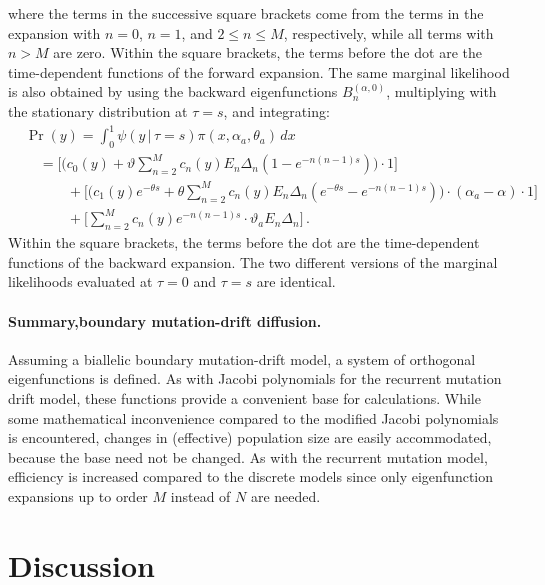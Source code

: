 \documentclass[preprint]{elsarticle}
\newcommand\given{{\,|\,}}
\newcommand\y{\ensuremath{y}}
\begin{document}
where the terms in the successive square brackets come from the terms in the expansion with $n=0$, $n=1$, and $2\leq n\leq M$, respectively, while all terms with $n>M$ are zero. Within the square brackets, the terms before the dot are the time-dependent functions of the forward expansion. The same marginal likelihood is also obtained by using the backward eigenfunctions $B_n^{(\alpha,0)}$, multiplying with the stationary distribution at $\tau=s$, and integrating:
\begin{equation}
\begin{split}
    &\Pr(\y)=\int_0^1 \psi(\y\given \tau=s)\pi(x,\alpha_a,\theta_a)\,dx\\
    &\quad=\bigg[\bigg(c_0(\y)+\vartheta\sum_{n=2}^M c_n(\y)E_n\Delta_n  (1-e^{-n(n-1)s})\bigg)\cdot 1\bigg]\\ &\quad\qquad+\bigg[\bigg(c_1(\y) e^{-\theta s}+\theta\sum_{n=2}^M c_n(\y)E_n\Delta_n(e^{-\theta s}- e^{-n(n-1)s})\bigg)\cdot (\alpha_a-\alpha)\cdot 1\bigg]\\
    &\quad\qquad+\bigg[\sum_{n=2}^M c_n(\y) e^{-n(n-1)s}\cdot \vartheta_a E_n\Delta_n\bigg]\,.
\end{split}
\end{equation}
Within the square brackets, the terms before the dot are the time-dependent functions of the backward expansion. The two different versions of the marginal likelihoods evaluated at $\tau=0$ and $\tau=s$ are identical.



\paragraph{Summary,boundary mutation-drift diffusion.} Assuming a biallelic boundary mutation-drift model, a system of orthogonal eigenfunctions is defined. As with Jacobi polynomials for the recurrent mutation drift model, these functions provide a convenient base for calculations. While some mathematical inconvenience compared to the modified Jacobi polynomials is encountered, changes in (effective) population size are easily accommodated, because the base need not be changed. As with the recurrent mutation model, efficiency is increased compared to the discrete models since only eigenfunction expansions up to order $M$ instead of $N$ are needed.

\section{Discussion}
\end{document}
